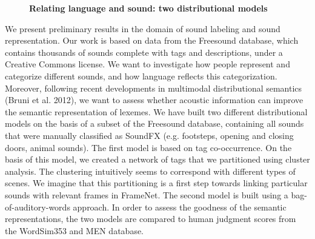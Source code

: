\documentclass[10pt, a4paper, twopage, headinclude, footinclude, BCOR5mm]{book}
\begin{document}
\newpage

\begin{figure}[t!]
\centering
\large\textbf{Relating language and sound: two distributional models}
\vspace*{0.5cm}
\end{figure}


\begin{table}[t!]
\end{table} 
\noindent
We present preliminary results in the domain of sound labeling and sound representation. Our work is based on data from the Freesound database, which contains thousands of sounds complete with tags and descriptions, under a Creative Commons license. We want to investigate how people represent and categorize different sounds, and how language reflects this categorization. Moreover, following recent developments in multimodal distributional semantics (Bruni et al. 2012), we want to assess whether acoustic information can improve the semantic representation of lexemes.  We have built two different distributional models on the basis of a subset of the Freesound database, containing all sounds that were manually classified as SoundFX (e.g. footsteps, opening and closing doors, animal sounds). The first model is based on tag co-occurrence. On the basis of this model, we created a network of tags that we partitioned using cluster analysis. The clustering intuitively seems to correspond with different types of scenes. We imagine that this partitioning is a first step towards linking particular sounds with relevant frames in FrameNet. The second model is built using a bag-of-auditory-words approach. In order to assess the goodness of the semantic representations, the two models are compared to human judgment scores from the WordSim353 and MEN database.  
\end{document}
